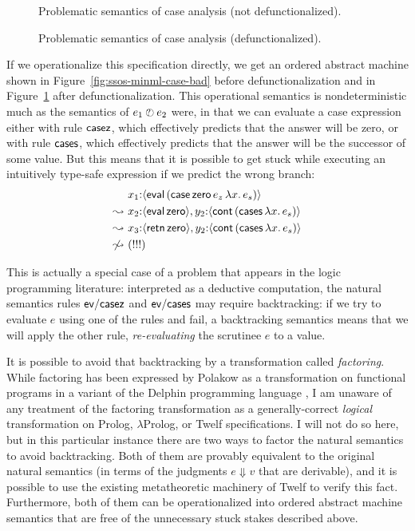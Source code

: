 \begin{figure}
\caption{Problematic semantics of case analysis (not defunctionalized).}
\label{fig:ssos-minml-case-bad}
\bigskip
{}
\caption{Problematic semantics of case analysis (defunctionalized).}
\label{fig:ssos-minml-case-bad-defun}
\end{figure}

If we operationalize this specification directly, we get an
ordered abstract machine shown in Figure~\ref{fig:ssos-minml-case-bad}
before defunctionalization and in
Figure~\ref{fig:ssos-minml-case-bad-defun} after defunctionalization.
This operational semantics is nondeterministic much as the semantics of
$e_1 \mathbin{\mbox{$\ocircle$\hspace{-7pt}{\footnotesize ?}\hspace{3pt}}} e_2$ were, in that we can evaluate a case expression either
with rule ${\sf casez}$, which effectively predicts that the answer
will be zero, or with rule ${\sf cases}$, which effectively predicts
that the answer will be the successor of some value. But this means that
it is possible to get stuck while executing 
an intuitively type-safe expression if we predict the wrong branch:
\begin{align*}
 & x_1{:}\langle {{\sf eval}\,({\sf case}\,{\sf zero}\,e_z\,\lambda x.\,e_s)} \rangle
\\
\leadsto ~ & 
x_2{:}\langle {{\sf eval}\,{\sf zero}} \rangle,
y_2{:}\langle {{\sf cont}\,({\sf cases}\,\lambda x.\,e_s)} \rangle
\\
\leadsto ~ & 
x_3{:}\langle {{\sf retn}\,{\sf zero}} \rangle,
y_2{:}\langle {{\sf cont}\,({\sf cases}\,\lambda x.\,e_s)} \rangle
\\
\not\leadsto ~ & (!!!)
\end{align*}

This is actually a special case of a problem that appears in the logic
programming literature: interpreted as a deductive computation, the
natural semantics rules ${\sf ev/casez}$ and ${\sf ev/cases}$ may
require backtracking: if we try to evaluate $e$ using one of the rules
and fail, a backtracking semantics means that we will apply the other
rule, {\it re-evaluating} the scrutinee $e$ to a value. 

It is possible to avoid that backtracking by a transformation called
{\it factoring}. While factoring has been expressed by Polakow as a
transformation on functional programs in a variant of the Delphin
programming language \cite{poswolsky03factoring}, I am unaware of any
treatment of the factoring transformation as a generally-correct {\it
  logical} transformation on Prolog, $\lambda$Prolog, or Twelf
specifications. I will not do so here, but in this particular instance
there are two ways to factor the natural semantics to avoid
backtracking.  Both of them are provably equivalent to the original
natural semantics (in terms of the judgments $e \Downarrow v$ that are
derivable), and it is possible to use the existing metatheoretic
machinery of Twelf to verify this fact. Furthermore, both of them can
be operationalized into ordered abstract machine semantics that are
free of the unnecessary stuck stakes described above. 

